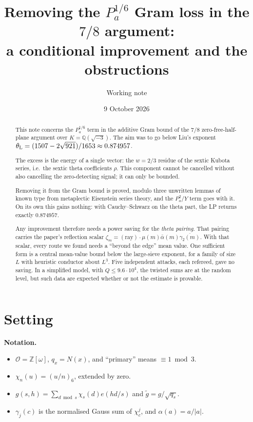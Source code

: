 \documentclass[11pt]{article}
\title{Removing the $P_a^{1/6}$ Gram loss in the $7/8$ argument:\\
a conditional improvement and the obstructions}
\author{Working note}
\date{9 October 2026}
\theoremstyle{definition}
\theoremstyle{remark}
\newcommand{\Q}{\mathbb{Q}}
\newcommand{\cO}{\mathcal{O}}
\newcommand{\tg}{\widetilde{g}}
\begin{document}
\sloppy
\setlength{\emergencystretch}{3em}
\maketitle

\begin{abstract}
This note concerns the $P_a^{1/6}$ term in the additive Gram bound of the $7/8$
zero-free-half-plane argument over $K=\Q(\sqrt{-3})$. The aim was to go below
Liu's exponent $\theta_{\rm L}=(1507-2\sqrt{921})/1653\approx0.874957$.

The excess is the energy of a single vector: the $w=2/3$ residue of the sextic
Kubota series, i.e.\ the sextic theta coefficients $\rho$. This component cannot
be cancelled without also cancelling the zero-detecting signal; it can only be
bounded.

Removing it from the Gram bound is proved, modulo three unwritten lemmas of
known type from metaplectic Eisenstein series theory, and the $P_a^2/Y$ term
goes with it. On its own this gains nothing: with Cauchy--Schwarz on the theta
part, the LP returns exactly $0.874957$.

Any improvement therefore needs a power saving for the \emph{theta pairing}. That
pairing carries the paper's reflection scalar
$\zeta_m=(\mathrm{ray})\cdot\mu(m)\bar\alpha(m)\overline{\gamma_2(m)}$. With
that scalar, every route we found needs a ``beyond the edge'' mean value. One
sufficient form is a central mean-value bound below the large-sieve exponent,
for a family of size $L$ with heuristic conductor about $L^3$. Five independent
attacks, each refereed, gave no saving. In a simplified model, with
$Q\le9.6\cdot10^4$, the twisted sums are at the random level, but such data are
expected whether or not the estimate is provable.
\end{abstract}

\section{Setting}

\textbf{Notation.}
\begin{itemize}[leftmargin=*]
\item $\cO=\mathbb Z[\omega]$, $q_x=N(x)$, and ``primary'' means $\equiv1\bmod3$.
\item $\chi_n(u)=(u/n)_6$, extended by zero.
\item $g(s,h)=\sum_{d\bmod s}\chi_s(d)e(hd/s)$ and $\tg=g/\sqrt{q_s}$.
\item $\gamma_j(c)$ is the normalised Gauss sum of $\chi_c^j$, and $\alpha(a)=a/|a|$.
\end{itemize}
\end{document}
